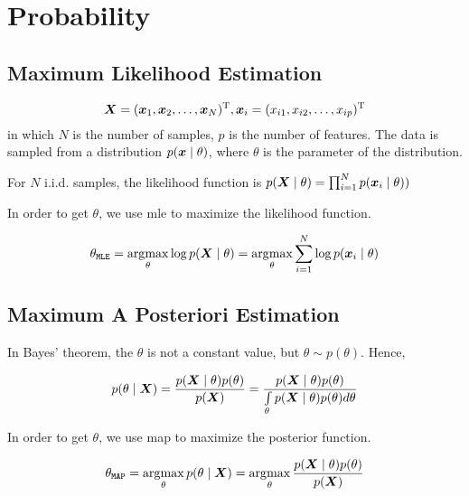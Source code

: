 
\chapter{Probability}\label{chp:Probability}
\minitoc

\section{Maximum Likelihood Estimation}

\begin{equation}
	\vX = (\vx_1, \vx_2, \dots, \vx_N)\transp, \vx_i = (x_{i1}, x_{i2},\dots, x_{ip})\transp
\end{equation}
in which $N$ is the number of samples, $p$ is the number of features.
The data is sampled from a distribution $p\giventhat{\vx}{\theta}$, where $\theta$ is the parameter of the distribution.


For \(N\)  i.i.d. samples, the likelihood function is \(p \giventhat{\vX}{\theta} = \prod_{i=1}^{N} p \giventhat{\vx_i}{\theta}) \)

In order to get \(\theta\), we use \gls{mle}  to maximize the likelihood function.

\begin{equation}
	\theta_{\mathtt{MLE}} = \argmax_{\theta} \log p\giventhat{\vX}{\theta} = \argmax_{\theta} \sum_{i=1}^{N} \log p\giventhat{\vx_i}{\theta}
\end{equation}

\section{Maximum A Posteriori Estimation}
In Bayes' theorem, the \(\theta\) is not a constant value, but \(\theta \sim  p(\theta) \).
Hence,

\begin{equation}
	p\giventhat{\theta}{\vX} = \frac{p\giventhat{\vX}{\theta} p(\theta)}{p(\vX)}  =  \frac{p\giventhat{\vX}{\theta} p(\theta)}{\int\limits_{\theta} p\giventhat{\vX}{\theta} p(\theta) d\theta}
\end{equation}


In order to get \(\theta\), we use \gls{map}  to maximize the posterior function.

\begin{equation}
	\theta_{\mathtt{MAP}} = \argmax_{\theta} p\giventhat{\theta}{\vX} = \argmax_{\theta} \frac{p\giventhat{\vX}{\theta} p(\theta)}{p(\vX)}
\end{equation}


